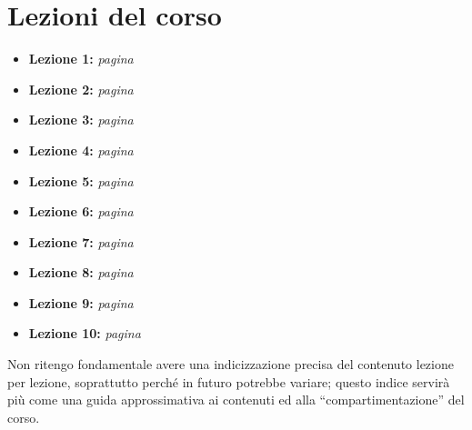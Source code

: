 \documentclass[a4paper,twoside]{book}
\begin{document}
	
	
	\newpage
	\section*{Lezioni del corso}
	\renewcommand{\labelitemi}{$\blacksquare$}
	\begin{itemize}
		\item {\large \textbf{Lezione 1:} \textit{pagina \pageref{lezione1}}}
		\item {\large \textbf{Lezione 2:} \textit{pagina \pageref{lezione2}}}
		\item {\large \textbf{Lezione 3:} \textit{pagina \pageref{lezione3}}}
		\item {\large \textbf{Lezione 4:} \textit{pagina \pageref{lezione4}}}
		\item {\large \textbf{Lezione 5:} \textit{pagina \pageref{lezione5}}}
		\item {\large \textbf{Lezione 6:} \textit{pagina \pageref{lezione6}}}
		\item {\large \textbf{Lezione 7:} \textit{pagina \pageref{lezione7}}}
		\item {\large \textbf{Lezione 8:} \textit{pagina \pageref{lezione8}}}
		\item {\large \textbf{Lezione 9:} \textit{pagina \pageref{lezione9}}}
		\item {\large \textbf{Lezione 10:} \textit{pagina \pageref{lezione9}}}
	\end{itemize}
	\renewcommand{\labelitemi}{$\bullet$}
	Non ritengo fondamentale avere una indicizzazione precisa del contenuto lezione per lezione, soprattutto perché in futuro potrebbe variare; questo indice servirà più come una guida approssimativa ai contenuti ed alla \enquote{compartimentazione} del corso.
	
	
	\mainmatter
	
	
	
	\appendix
	
	
	
	
	\printbibliography
	
	
	
\end{document}
